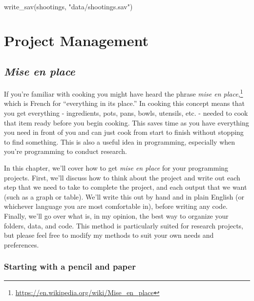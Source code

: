 \documentclass[
  a4paper,
]{krantz}
\makeatletter
\newenvironment{Shaded}{\begin{snugshade}}{\end{snugshade}}
\newcommand{\FunctionTok}[1]{\textcolor[rgb]{0,0,0}{#1}}
\newcommand{\NormalTok}[1]{#1}
\newcommand{\StringTok}[1]{\textcolor[rgb]{0.5,0.5,0.5}{#1}}
\renewcommand{\href}[2]{#2\footnote{\url{#1}}}
\newenvironment{kframe}{%
\medskip{}
\setlength{\fboxsep}{.8em}
 \def\at@end@of@kframe{}%
 \ifinner\ifhmode%
  \def\at@end@of@kframe{\end{minipage}}%
  \begin{minipage}{\columnwidth}%
 \fi\fi%
 \def\FrameCommand##1{\hskip\@totalleftmargin \hskip-\fboxsep
 \colorbox{shadecolor}{##1}\hskip-\fboxsep
     \hskip-\linewidth \hskip-\@totalleftmargin \hskip\columnwidth}%
 \MakeFramed {\advance\hsize-\width
   \@totalleftmargin\z@ \linewidth\hsize
   \@setminipage}}%
 {\par\unskip\endMakeFramed%
 \at@end@of@kframe}
\renewenvironment{Shaded}{\begin{kframe}}{\end{kframe}}
\makeatother
\begin{document}
\begin{Shaded}
\begin{Highlighting}[]
\FunctionTok{write\_sav}\NormalTok{(shootings, }\StringTok{"data/shootings.sav"}\NormalTok{)}
\end{Highlighting}
\end{Shaded}

\hypertarget{part-project-management}{%
\part{Project
Management}\label{part-project-management}}

\hypertarget{mise-en-place}{%
\chapter{\texorpdfstring{\emph{Mise en
place}}{Mise en place}}\label{mise-en-place}}

If you're familiar with cooking you might have heard the
phrase
\href{https://en.wikipedia.org/wiki/Mise_en_place}{\emph{mise
en place},} which is French for ``everything in its place.''
In cooking this concept means that you get everything -
ingredients, pots, pans, bowls, utensils, etc. - needed to
cook that item ready before you begin cooking. This saves
time as you have everything you need in front of you and can
just cook from start to finish without stopping to find
something. This is also a useful idea in programming,
especially when you're programming to conduct research.

In this chapter, we'll cover how to get \emph{mise en place}
for your programming projects. First, we'll discuss how to
think about the project and write out each step that we need
to take to complete the project, and each output that we
want (such as a graph or table). We'll write this out by
hand and in plain English (or whichever language you are
most comfortable in), before writing any code. Finally,
we'll go over what is, in my opinion, the best way to
organize your folders, data, and code. This method is
particularly suited for research projects, but please feel
free to modify my methods to suit your own needs and
preferences.

\hypertarget{starting-with-a-pencil-and-paper}{%
\section{Starting with a pencil and
paper}\label{starting-with-a-pencil-and-paper}}
\end{document}
